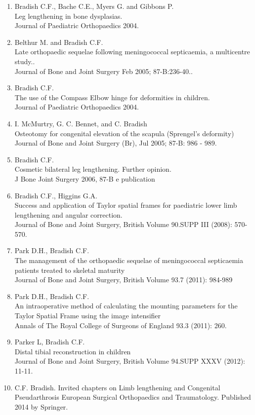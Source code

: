 \documentclass[margin,line]{res}
\begin{document}
\begin{resume}
\begin{enumerate}
\item Bradish C.F., Bache C.E., Myers G. and Gibbons P.\\
Leg lengthening in bone dysplasias.\\
    Journal of Paediatric Orthopaedics 2004.
\item Belthur M. and Bradish C.F.\\
Late orthopaedic sequelae  following  meningococcal  septicaemia, a multicentre study..\\
Journal of Bone and Joint Surgery  Feb 2005; 87-B:236-40..
\item Bradish C.F.\\
The use of the Compass Elbow hinge for deformities in children.\\
Journal of Paediatric Orthopaedics 2004.
\item I. McMurtry, G. C. Bennet, and C. Bradish\\
      Osteotomy for congenital elevation of the scapula (Sprengel's deformity)\\
   Journal of Bone and Joint Surgery (Br), Jul 2005; 87-B: 986 - 989. 
\item Bradish C.F.\\
      Cosmetic bilateral leg lengthening. Further opinion.\\
   J Bone Joint Surgery 2006, 87-B e publication
 \item Bradish C.F., Higgins G.A.\\
Success and  application  of Taylor spatial frames  for  paediatric lower  limb lengthening and angular correction.\\
Journal of Bone and Joint Surgery, British Volume 90.SUPP III (2008): 570-570.
\item Park D.H., Bradish C.F.\\
The management  of the orthopaedic sequelae of meningococcal septicaemia patients treated to skeletal maturity\\
Journal of Bone and Joint Surgery, British Volume 93.7 (2011): 984-989
\item Park D.H., Bradish C.F.\\
An intraoperative method of calculating the mounting parameters for the Taylor Spatial Frame using the image intensifier\\
Annals of The Royal College of Surgeons of England 93.3 (2011): 260.
\item Parker L, Bradish C.F.\\
Distal tibial reconstruction in children\\
Journal of Bone and Joint Surgery, British Volume 94.SUPP XXXV (2012): 11-11.
\item C.F. Bradish. Invited chapters on Limb lengthening and Congenital Pseudarthrosis
European Surgical Orthopaedics and Traumatology. Published 2014 by Springer. 
\end{enumerate}

\end{resume}
\end{document}
